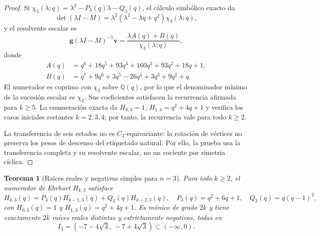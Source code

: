 \documentclass[11pt,a4paper]{article}
\newtheorem{theorem}{Teorema}[section]
\theoremstyle{definition}
\begin{document}
\begin{proof}
Si
$\chi_3(\lambda;q)=\lambda^2-P_3(q)\lambda-Q_3(q)$, el cálculo
simbólico exacto da
\[
\det(\lambda I-M)=
\lambda^2(\lambda^2-\lambda q+q^2)\chi_3(\lambda;q),
\]
y el resolvente escalar es
\[
\mathbf g(\lambda I-M)^{-1}\mathbf v
=\frac{\lambda A(q)+B(q)}{\chi_3(\lambda;q)},
\]
donde
\begin{align*}
A(q)&=q^6+18q^5+93q^4+160q^3+93q^2+18q+1,\\
B(q)&=q^7+9q^6+3q^5-26q^4+3q^3+9q^2+q.
\end{align*}
El numerador es coprimo con $\chi_3$ sobre $\mathbb Q(q)$, por lo que
el denominador mínimo de la sucesión escalar es $\chi_3$. Sus
coeficientes satisfacen la recurrencia afirmada para $k\ge5$. La
enumeración exacta da $H_{0,3}=1$, $H_{1,3}=q^2+4q+1$ y verifica los
casos iniciales restantes $k=2,3,4$; por tanto, la recurrencia vale para
todo $k\ge2$.

La transferencia de seis estados no es $C_3$-equivariante: la rotación
de vértices no preserva los pesos de descenso del etiquetado natural.
Por ello, la prueba usa la transferencia completa y su resolvente
escalar, no un cociente por simetría cíclica.
\end{proof}

\begin{theorem}[Raíces reales y negativas simples para $n=3$]
\label{thm:n3-raices}
Para todo $k\ge2$, el numerador de Ehrhart $H_{k,3}$ satisface
\[
H_{k,3}(q)=P_3(q)H_{k-1,3}(q)+Q_3(q)H_{k-2,3}(q),
\quad
P_3(q)=q^2+6q+1,\quad Q_3(q)=q(q-1)^2,
\]
con $H_{0,3}(q)=1$ y $H_{1,3}(q)=q^2+4q+1$. Es mónico de grado $2k$
y tiene exactamente $2k$ raíces reales distintas y estrictamente
negativas, todas en
\[
I_3=(-7-4\sqrt3,\,-7+4\sqrt3)\subset(-\infty,0).
\]
\end{theorem}
\end{document}

